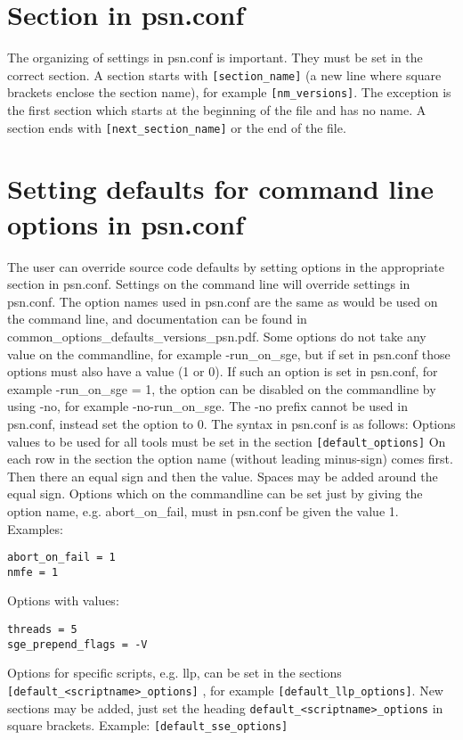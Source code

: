 \section{Section in psn.conf}
The organizing of settings in psn.conf is important. They must be set in the correct section. A section starts with
\verb|[section_name]| 
(a new line where square brackets enclose the section name), for example
\verb|[nm_versions]|.
The exception is the first section which starts at the beginning of the file and has no name.
A section ends with 
\verb|[next_section_name]|
or the end of the file.

\section{Setting defaults for command line options in psn.conf}

The user can override source code defaults by setting options in the appropriate section in psn.conf. Settings on the command line will override settings in psn.conf. The option names used in psn.conf are the same as would be used on the command line, and documentation can be found in common\_options\_defaults\_versions\_psn.pdf. Some options do not take any value on the commandline, for example -run\_on\_sge, but if set in psn.conf those options must also have a value (1 or 0). If such an option is set in psn.conf, for example
-run\_on\_sge = 1, the option can be disabled on the commandline by using -no, for example 
-no-run\_on\_sge. The -no prefix cannot be used in psn.conf, instead set the option to 0.
The syntax in psn.conf is as follows: Options values to be used for all tools must be set in the section \verb|[default_options]| 
On each row in the section the option name (without leading minus-sign) comes first. Then there an equal sign and then the value. Spaces may be added around the equal sign. Options which on the commandline can be set just by giving the option name, e.g. abort\_on\_fail, must in psn.conf be given the value 1. Examples:
\begin{verbatim}
abort_on_fail = 1
nmfe = 1
\end{verbatim}
Options with values:
\begin{verbatim}
threads = 5
sge_prepend_flags = -V 
\end{verbatim}
Options for specific scripts, e.g. llp, can be set in the sections \verb|[default_<scriptname>_options]| , for example \verb|[default_llp_options]|. New sections may be added, just set the heading \verb|default_<scriptname>_options| in square brackets. Example:
\verb|[default_sse_options]|


